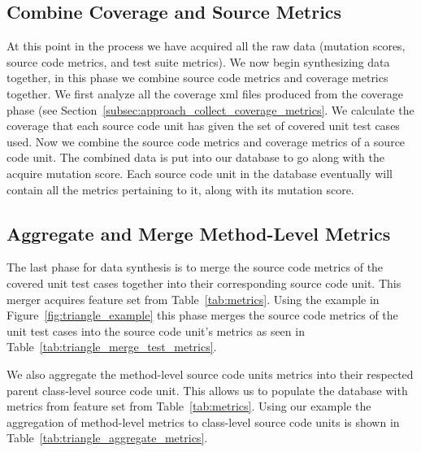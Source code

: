 \subsection{Combine Coverage and Source Metrics}
\label{subsec:approach_combine_metrics}
At this point in the process we have acquired all the raw data (mutation scores, source code metrics, and test suite metrics). We now begin synthesizing data together, in this phase we combine source code metrics and coverage metrics together. We first analyze all the coverage \gls{xml} files produced from the coverage phase (see Section~\ref{subsec:approach_collect_coverage_metrics}. We calculate the coverage that each source code unit has given the set of covered unit test cases used. Now we combine the source code metrics and coverage metrics of a source code unit. The combined data is put into our database to go along with the acquire mutation score. Each source code unit in the database eventually will contain all the metrics pertaining to it, along with its mutation score.


\subsection{Aggregate and Merge Method-Level Metrics}
\label{subsec:approach_aggregate_merge_metrics}
The last phase for data synthesis is to merge the source code metrics of the covered unit test cases together into their corresponding source code unit. This merger acquires feature set  from Table~\ref{tab:metrics}. Using the example in Figure~\ref{fig:triangle_example} this phase merges the source code metrics of the unit test cases into the source code unit's metrics as seen in Table~\ref{tab:triangle_merge_test_metrics}.

We also aggregate the method-level source code units metrics into their respected parent class-level source code unit. This allows us to populate the database with metrics from feature set  from Table~\ref{tab:metrics}. Using our example the aggregation of method-level metrics to class-level source code units is shown in Table~\ref{tab:triangle_aggregate_metrics}.

